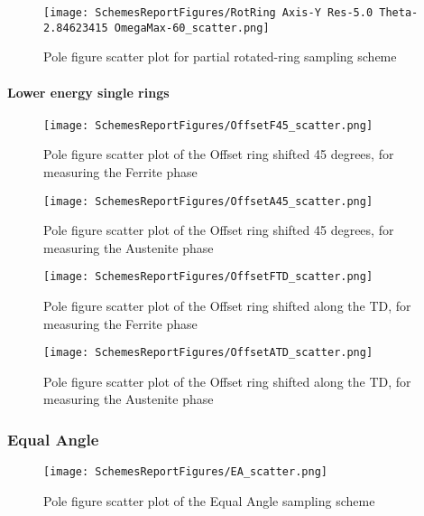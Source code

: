 \documentclass{article}
\begin{document}
\begin{figure}[H]
    \centering
    \texttt{[image: SchemesReportFigures/RotRing Axis-Y Res-5.0 Theta-2.84623415 OmegaMax-60\_scatter.png]}
    \caption{Pole figure scatter plot for partial rotated-ring sampling scheme}
\end{figure}

\paragraph{Lower energy single rings}

\begin{figure}[H]
    \centering
    \texttt{[image: SchemesReportFigures/OffsetF45\_scatter.png]}
    \caption{Pole figure scatter plot of the Offset ring shifted 45 degrees, for measuring the Ferrite phase}
\end{figure}

\begin{figure}[H]
    \centering
    \texttt{[image: SchemesReportFigures/OffsetA45\_scatter.png]}
    \caption{Pole figure scatter plot of the Offset ring shifted 45 degrees, for measuring the Austenite phase}
\end{figure}

\begin{figure}[H]
    \centering
    \texttt{[image: SchemesReportFigures/OffsetFTD\_scatter.png]}
    \caption{Pole figure scatter plot of the Offset ring shifted along the TD, for measuring the Ferrite phase}
\end{figure}

\begin{figure}[H]
    \centering
    \texttt{[image: SchemesReportFigures/OffsetATD\_scatter.png]}
    \caption{Pole figure scatter plot of the Offset ring shifted along the TD, for measuring the Austenite phase}
\end{figure}


\subsubsection{Equal Angle}



\begin{figure}[H]
    \centering
    \texttt{[image: SchemesReportFigures/EA\_scatter.png]}
    \caption{Pole figure scatter plot of the Equal Angle sampling scheme}
\end{figure}
\end{document}

